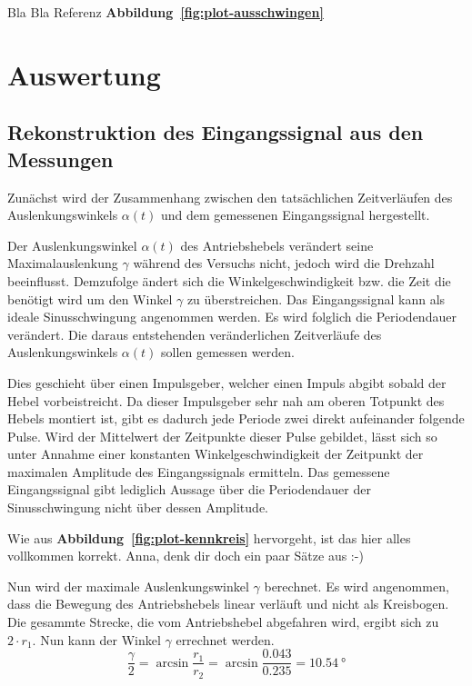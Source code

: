 \documentclass[a4paper,12pt]{scrartcl}
\begin{document}
Bla Bla Referenz \textbf{Abbildung~\ref{fig:plot-ausschwingen}} 

\section{Auswertung}

\subsection{Rekonstruktion des Eingangssignal aus den Messungen}

Zunächst wird der Zusammenhang zwischen den tatsächlichen Zeitverläufen des Auslenkungswinkels $\alpha \left( t \right)$ und dem gemessenen Eingangssignal hergestellt.

Der Auslenkungswinkel $\alpha \left( t \right)$ des Antriebshebels verändert seine Maximalauslenkung $\gamma$ während des Versuchs nicht, jedoch wird die Drehzahl beeinflusst.
Demzufolge ändert sich die Winkelgeschwindigkeit bzw. die Zeit die benötigt wird um den Winkel $\gamma$ zu überstreichen.
Das Eingangssignal kann als ideale Sinusschwingung angenommen werden.
Es wird folglich die Periodendauer verändert. Die daraus entstehenden veränderlichen Zeitverläufe des Auslenkungswinkels $\alpha \left( t \right)$ sollen gemessen werden.

Dies geschieht über einen Impulsgeber, welcher einen Impuls abgibt sobald der Hebel vorbeistreicht.
Da dieser Impulsgeber sehr nah am oberen Totpunkt des Hebels montiert ist, gibt es dadurch jede Periode zwei direkt aufeinander folgende Pulse.
Wird der Mittelwert der Zeitpunkte dieser Pulse gebildet, lässt sich so unter Annahme einer konstanten Winkelgeschwindigkeit der Zeitpunkt der maximalen Amplitude des Eingangssignals ermitteln.
Das gemessene Eingangssignal gibt lediglich Aussage über die Periodendauer der Sinusschwingung nicht über dessen Amplitude.

Wie aus \textbf{Abbildung~\ref{fig:plot-kennkreis}} hervorgeht, ist das hier alles vollkommen korrekt. Anna, denk dir doch ein paar Sätze aus :-) 

Nun wird der maximale Auslenkungswinkel $\gamma$ berechnet. Es wird angenommen, dass die Bewegung des Antriebshebels linear verläuft und nicht als Kreisbogen.
Die gesammte Strecke, die vom Antriebshebel abgefahren wird, ergibt sich zu $2 \cdot r_1$. Nun kann der Winkel $\gamma$ errechnet werden.
\begin{equation}
	\frac{\gamma}{2} = \arcsin{\frac{r_1}{r_2}} = \arcsin{\frac{0.043}{0.235}} =  \SI{10.54}{\degree}
\end{equation}
\end{document}
